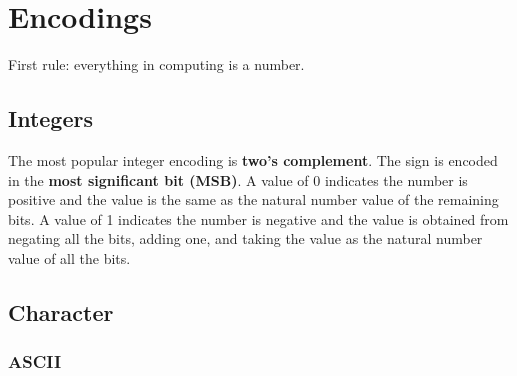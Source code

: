 \chapter{Encodings}

First rule: everything in computing is a number.

\section{Integers}

The most popular integer encoding is \textbf{two's complement}. The sign is
encoded in the \textbf{most significant bit (MSB)}. A value of 0 indicates the
number is positive and the value is the same as the natural number value of the
remaining bits. A value of 1 indicates the number is negative and the value is
obtained from negating all the bits, adding one, and taking the value as the
natural number value of all the bits.

\newpage
\section{Character}

\subsection{ASCII}

